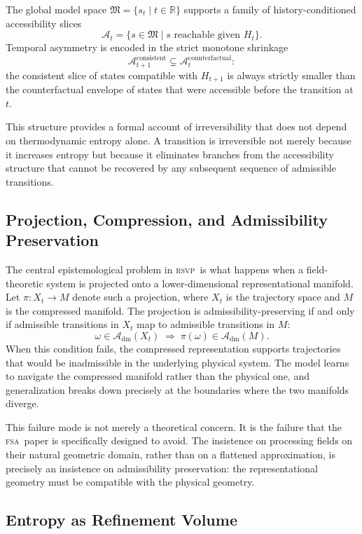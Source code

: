 \documentclass[11pt,a4paper]{article}
\theoremstyle{plain}
\theoremstyle{definition}
\theoremstyle{remark}
\newcommand{\A}{\mathcal{A}}
\newcommand{\fM}{\mathfrak{M}}
\newcommand{\Adm}{\mathcal{A}_{\mathrm{dm}}}
\newcommand{\RSVP}{\textup{\textsc{rsvp}}}
\newcommand{\FSA}{\textup{\textsc{fsa}}}
\begin{document}
The global model space $\fM = \{s_t \mid t \in \mathbb{R}\}$ supports a
family of history-conditioned accessibility slices
\[
\A_t = \bigl\{s \in \fM \mid s \text{ reachable given } H_t\bigr\}.
\]
Temporal asymmetry is encoded in the strict monotone shrinkage
\[
\A_{t+1}^{\mathrm{consistent}} \subsetneq \A_t^{\mathrm{counterfactual}}:
\]
the consistent slice of states compatible with $H_{t+1}$ is always
strictly smaller than the counterfactual envelope of states that were
accessible before the transition at $t$.

This structure provides a formal account of irreversibility that does not
depend on thermodynamic entropy alone. A transition is irreversible not
merely because it increases entropy but because it eliminates branches from
the accessibility structure that cannot be recovered by any subsequent
sequence of admissible transitions.

\subsection{Projection, Compression, and Admissibility Preservation}

The central epistemological problem in \RSVP\ is what happens when a
field-theoretic system is projected onto a lower-dimensional representational
manifold. Let $\pi: X_t \to M$ denote such a projection, where $X_t$ is
the trajectory space and $M$ is the compressed manifold. The projection is
admissibility-preserving if and only if admissible transitions in $X_t$
map to admissible transitions in $M$:
\[
\omega \in \Adm(X_t) \;\Rightarrow\; \pi(\omega) \in \Adm(M).
\]
When this condition fails, the compressed representation supports
trajectories that would be inadmissible in the underlying physical system.
The model learns to navigate the compressed manifold rather than the
physical one, and generalization breaks down precisely at the boundaries
where the two manifolds diverge.

This failure mode is not merely a theoretical concern. It is the failure
that the \FSA\ paper is specifically designed to avoid. The insistence on
processing fields on their natural geometric domain, rather than on a
flattened approximation, is precisely an insistence on admissibility
preservation: the representational geometry must be compatible with the
physical geometry.

\subsection{Entropy as Refinement Volume}
\end{document}
